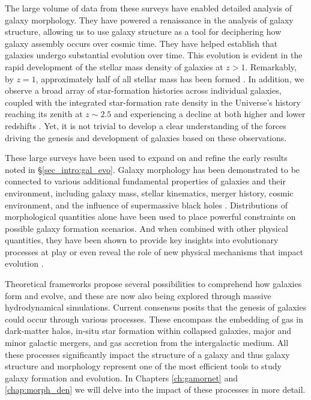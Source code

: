 The large volume of data from these surveys have enabled detailed analysis of galaxy morphology. They have powered a renaissance in the analysis of galaxy structure, allowing us to use galaxy structure as a tool for deciphering how galaxy assembly occurs over cosmic time. They have helped establish that galaxies undergo substantial evolution over time. This evolution is evident in the rapid development of the stellar mass density of galaxies at $z > 1$. Remarkably, by $z = 1$, approximately half of all stellar mass has been formed \citep[e.g.,][]{bundy_05,mortlock_11}. In addition, we observe a broad array of star-formation histories across individual galaxies, coupled with the integrated star-formation rate density in the Universe's history reaching its zenith at $z \sim 2.5$ and experiencing a decline at both higher and lower redshifts \citep[e.g.,][]{shapely_11, madau_dickinson_14}. Yet, it is not trivial to develop  a clear understanding of the forces driving the genesis and development of galaxies based on these observations. 

These large surveys have been used to expand on and refine the early results noted in \S \ref{sec_intro:gal_evo}. Galaxy morphology has been demonstrated to be connected to various additional fundamental properties of galaxies and their environment, including galaxy mass, stellar kinematics, merger history, cosmic environment, and the influence of supermassive black holes \citep[e.g.,][]{Tremaine2002TheCorrelation, pozzetti_10, wuyts_11, Huertas-Company2016MassCANDELS,powell_17, shimakawa_2021, Dimauro2022CoincidenceGrowth}. Distributions of morphological quantities alone have been used to place powerful constraints on possible galaxy formation scenarios. And when combined with other physical quantities, they have been shown to provide key insights into evolutionary processes at play or even reveal the role of new physical  mechanisms that impact evolution \citep[e.g.,][]{Kauffmann2004TheGalaxies,Weinmann2006PropertiesMass,Schawinski2007TheGalaxies,vanderWel2008TheMass,Schawinski2014TheGalaxies}.

Theoretical frameworks propose several possibilities to comprehend how galaxies form and evolve, and these are now also being explored through massive hydrodynamical simulations. Current consensus posits that the genesis of galaxies could occur through various processes. These encompass the embedding of gas in dark-matter halos, in-situ star formation within collapsed galaxies, major and minor galactic mergers, and gas accretion from the intergalactic medium. All these processes significantly impact the structure of a galaxy and thus galaxy structure and morphology represent one of the most efficient tools to study galaxy formation and evolution. In Chapters \ref{ch:gamornet} and \ref{chap:morph_den} we will delve into the impact of these processes in more detail. 

